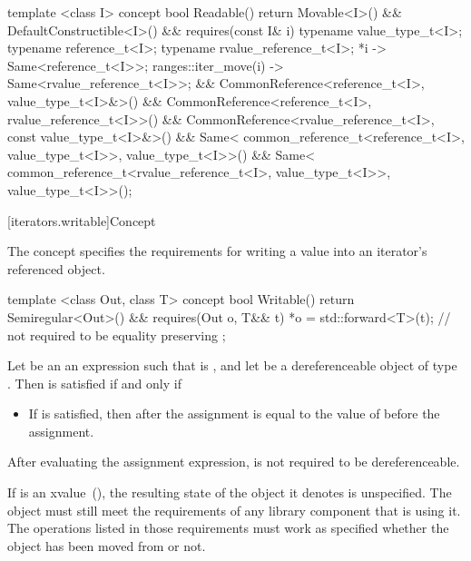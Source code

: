 %
\begin{codeblock}
  template <class I>
  concept bool Readable() {
    return Movable<I>() && DefaultConstructible<I>() &&
      requires(const I& i) {
        typename value_type_t<I>;
        typename reference_t<I>;
        typename rvalue_reference_t<I>;
        { *i } -> Same<reference_t<I>>;
        { ranges::iter_move(i) } -> Same<rvalue_reference_t<I>>;
      } &&
      CommonReference<reference_t<I>, value_type_t<I>&>() &&
      CommonReference<reference_t<I>, rvalue_reference_t<I>>() &&
      CommonReference<rvalue_reference_t<I>, const value_type_t<I>&>() &&
      Same<
        common_reference_t<reference_t<I>, value_type_t<I>>,
        value_type_t<I>>() &&
      Same<
        common_reference_t<rvalue_reference_t<I>, value_type_t<I>>,
        value_type_t<I>>();
  }
\end{codeblock}

[iterators.writable]{Concept }

\pnum
The  concept specifies the requirements for writing a value into an iterator's
referenced object.

%
\begin{codeblock}
  template <class Out, class T>
  concept bool Writable() {
    return Semiregular<Out>() &&
      requires(Out o, T&& t) {
        *o = std::forward<T>(t); // not required to be equality preserving
      };
  }
\end{codeblock}

\pnum
Let  be an an expression such that  is , and let 
be a dereferenceable object of type . Then  is satisfied if and only if

\begin{itemize}
\item If  is satisfied,
then  after the assignment is equal
to the value of  before the assignment.
\end{itemize}

\pnum
After evaluating the assignment expression,  is not required to be dereferenceable.

\pnum
If  is an xvalue~(), the resulting
state of the object it denotes is unspecified. \enternote The object must still meet the
requirements of any library component that is using it. The operations listed
in those requirements must work as specified whether the object has been moved
from or not.\exitnote

